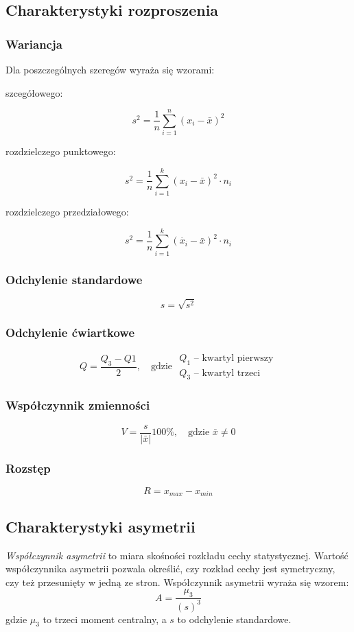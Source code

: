 \documentclass[../Matematyka.tex]{subfiles}
\begin{document}
\subsection{Charakterystyki rozproszenia}
\subsubsection*{Wariancja}
Dla poszczególnych szeregów wyraża się wzorami:
\begin{multicols}{3}
    \begin{center}szcegółowego:\end{center}
    \[s^2=\frac{1}{n}\sum_{i=1}^{n}(x_i - \bar{x})^2\]
    \begin{center}rozdzielczego punktowego:\end{center}
    \[s^2=\frac{1}{n}\sum_{i=1}^{k}(x_i - \bar{x})^2 \cdot n_i\]
    \begin{center}rozdzielczego przedziałowego:\end{center}
    \[s^2=\frac{1}{n}\sum_{i=1}^{k}(\dot{x_i} - \bar{x})^2 \cdot n_i\]
\end{multicols}

\subsubsection*{Odchylenie standardowe}
\[s = \sqrt{s^2}\]

\subsubsection*{Odchylenie ćwiartkowe}
\[Q=\frac{Q_3-Q1}{2}, \quad \text{gdzie } \substack{Q_1\text{ -- kwartyl pierwszy}\\Q_3\text{ -- kwartyl trzeci}}\]

\subsubsection*{Współczynnik zmienności}
\[V = \frac{s}{|\bar{x}|}100\%, \quad \text{gdzie } \bar{x} \neq 0\]

\subsubsection*{Rozstęp}
\[R = x_{max} - x_{min}\]

\subsection{Charakterystyki asymetrii}
{\it Współczynnik asymetrii} to miara skośności rozkładu cechy statystycznej. Wartość współczynnika asymetrii pozwala określić, czy rozkład cechy jest symetryczny, czy też przesunięty w jedną ze stron. Współczynnik asymetrii wyraża się wzorem:
\[A = \frac{\mu_3}{(s)^3}\]
gdzie \(\mu_3\) to trzeci moment centralny, a \(s\) to odchylenie standardowe.
\end{document}
